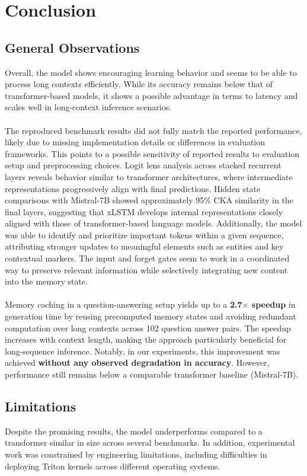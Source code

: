 \section{Conclusion}
\label{ch:conclusion-and-future-work}
\subsection{General Observations}

Overall, the model shows encouraging learning behavior and seems to be able to process
long contexts efficiently. While its accuracy remains below that of transformer-based
models, it shows a possible advantage in terms to latency and scales well in 
long-context inference scenarios.\\ \\
%
The reproduced benchmark results did not fully match the reported performance, 
likely due to missing implementation details or differences in evaluation frameworks.
This points to a possible sensitivity of reported results to evaluation setup and 
preprocessing choices.
%
Logit lens analysis across stacked recurrent layers reveals behavior similar to transformer 
architectures, where intermediate representations progressively align with final predictions. 
Hidden state comparisons with Mistral-7B showed approximately 95\% CKA similarity in 
the final layers, suggesting that xLSTM develops internal representations closely aligned with those of transformer-based language models. Additionally, the model was able to identify 
and prioritize important tokens within a given sequence, attributing stronger updates to meaningful elements 
such as entities and key contextual markers. The input and forget gates seem to work in a coordinated way to 
preserve relevant information while selectively integrating new content into the memory state. \\ \\
%
Memory caching in a question-answering setup yields up to a \textbf{2.7$\times$ speedup} in generation 
time by reusing precomputed memory states and avoiding redundant computation over long contexts 
across 102 question answer pairs.
The speedup increases with context length, making the approach particularly beneficial 
for long-sequence inference. Notably, in our experiments, this improvement was achieved 
\textbf{without any observed degradation in accuracy}. However, performance still remains below 
a comparable transformer baseline (Mistral-7B).
%
\subsection{Limitations}
Despite the promising results, the model underperforms compared to a transformer similar in size
across several benchmarks. In addition, experimental work was constrained 
by engineering limitations, including difficulties in deploying Triton kernels across 
different operating systems.

